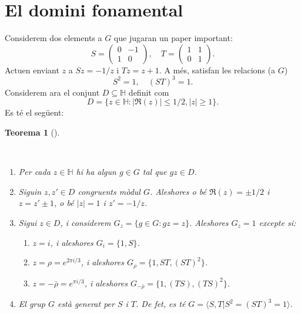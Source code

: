 \documentclass[
  letterpaper,
  DIV=11,
  numbers=noendperiod]{scrreprt}
\providecommand{\tightlist}{%
  \setlength{\itemsep}{0pt}\setlength{\parskip}{0pt}}\usepackage{longtable,booktabs,array}
\theoremstyle{plain}
\newtheorem{theorem}{Teorema}[chapter]
\theoremstyle{plain}
\theoremstyle{definition}
\theoremstyle{plain}
\theoremstyle{plain}
\theoremstyle{definition}
\theoremstyle{remark}
\begin{document}
\section{El domini fonamental}\label{el-domini-fonamental}

Considerem dos elements a \(G\) que jugaran un paper important: \[
S = \left(\begin{smallmatrix}0&-1\\1&0\end{smallmatrix}\right),\quad T = \left(\begin{smallmatrix}1&1\\0&1\end{smallmatrix}\right).
\] Actuen enviant \(z\) a \(S z=-1/z\) i \(T z = z+1\). A més, satisfan
les relacions (a \(G\)) \[
S^2=1,\quad (ST)^3=1.
\] Considerem ara el conjunt \(D\subseteq \mathbb{H}\) definit com \[
D = \{ z \in \mathbb{H}: |\Re(z)|\leq 1/2, |z| \geq 1 \}.
\] Es té el següent:

\begin{theorem}[]\protect\hypertarget{thm-fundom}{}\label{thm-fundom}

~

\begin{enumerate}
\def\labelenumi{\arabic{enumi}.}
\item
  Per cada \(z\in\mathbb{H}\) hi ha algun \(g\in G\) tal que
  \(gz\in D\).
\item
  Siguin \(z, z'\in D\) congruents mòdul \(G\). Aleshores o bé
  \(\Re(z)=\pm 1/2\) i \(z=z'\pm 1\), o bé \(|z| = 1\) i \(z'=-1/z\).
\item
  Sigui \(z\in D\), i considerem \(G_z=\{g \in G: g z = z\}\). Aleshores
  \(G_z=1\) excepte si:

  \begin{enumerate}
  \def\labelenumii{\alph{enumii}.}
  \tightlist
  \item
    \(z=i\), i aleshores \(G_i = \{1, S\}\).
  \item
    \(z = \rho=e^{2\pi i/3}\), i aleshores \(G_\rho=\{1, ST, (ST)^2\}\).
  \item
    \(z = -\bar\rho=e^{\pi i /3}\), i aleshores
    \(G_{-\bar\rho}=\{1, (TS), (TS)^2\}\).
  \end{enumerate}
\item
  El grup \(G\) està generat per \(S\) i \(T\). De fet, es té
  \(G=\langle S, T | S^2=(ST)^3=1 \rangle\).
\end{enumerate}

\end{theorem}
\end{document}
